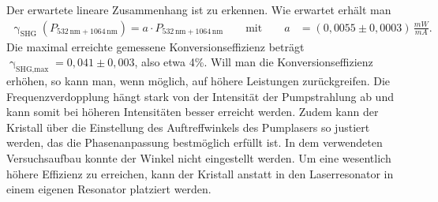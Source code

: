 \documentclass[twoside,colorback,accentcolor=tud4c,11pt]{tudreport}
\begin{document}
Der erwartete lineare Zusammenhang ist zu erkennen. Wie erwartet erhält man 
\begin{align*}
\upgamma_{\text{SHG}}(P_{532\,\text{nm}+1064\,\text{nm}})=a\cdot P_{532\,\text{nm}+1064\,\text{nm}} \qquad \text{mit} \qquad
a&=(0,0055\pm0,0003)\,\frac{\si{mW}}{\si{mA}}.
\end{align*}
Die maximal erreichte gemessene Konversionseffizienz beträgt $\upgamma_{\text{SHG,max}}=0,041\pm0,003$, also etwa 4\%. Will man die Konversionseffizienz erhöhen, so kann man, wenn möglich, auf höhere Leistungen zurückgreifen. Die Frequenzverdopplung hängt stark von der Intensität der Pumpstrahlung ab und kann somit bei höheren Intensitäten besser erreicht werden. Zudem kann der Kristall über die Einstellung des Auftreffwinkels des Pumplasers so justiert werden, das die Phasenanpassung bestmöglich erfüllt ist. In dem verwendeten Versuchsaufbau konnte der Winkel nicht eingestellt werden. Um eine wesentlich höhere Effizienz zu erreichen, kann der Kristall anstatt in den Laserresonator in einem eigenen Resonator platziert werden.
\end{document}
